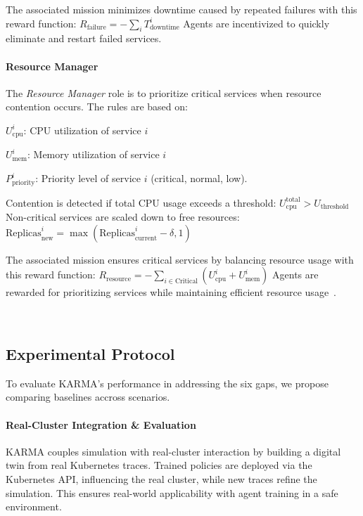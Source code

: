 The associated mission minimizes downtime caused by repeated failures with this reward function:
$R_{\text{failure}} = - \sum_{i} T_{\text{downtime}}^i$
Agents are incentivized to quickly eliminate and restart failed services.

\noindent \paragraph{\textbf{Resource Manager}}

The \textit{Resource Manager} role is to prioritize critical services when resource contention occurs. The rules are based on:
\begin{enumerate*}[label={}, itemjoin={;\quad }]
  \item \( U_{\text{cpu}}^i \): CPU utilization of service \( i \)
  \item \( U_{\text{mem}}^i \): Memory utilization of service \( i \)
  \item \( P_{\text{priority}}^i \): Priority level of service \( i \) (critical, normal, low).
\end{enumerate*}
Contention is detected if total CPU usage exceeds a threshold:
$U_{\text{cpu}}^{\text{total}} > U_{\text{threshold}}$
Non-critical services are scaled down to free resources:
$\text{Replicas}_{\text{new}}^i = \max\left( \text{Replicas}_{\text{current}}^i - \delta, 1 \right)$

The associated mission ensures critical services by balancing resource usage with this reward function:
$R_{\text{resource}} = - \sum_{i \in \text{Critical}} \left( U_{\text{cpu}}^i + U_{\text{mem}}^i \right)$
Agents are rewarded for prioritizing services while maintaining efficient resource usage~\cite{shahrad2020resource}.

\

\subsection{Experimental Protocol}

\noindent To evaluate KARMA's performance in addressing the six gaps, we propose comparing baselines accross scenarios.

\paragraph{\textbf{Real-Cluster Integration \& Evaluation}}

KARMA couples simulation with real-cluster interaction by building a digital twin from real Kubernetes traces. Trained policies are deployed via the Kubernetes API, influencing the real cluster, while new traces refine the simulation. This ensures real-world applicability with agent training in a safe environment.

